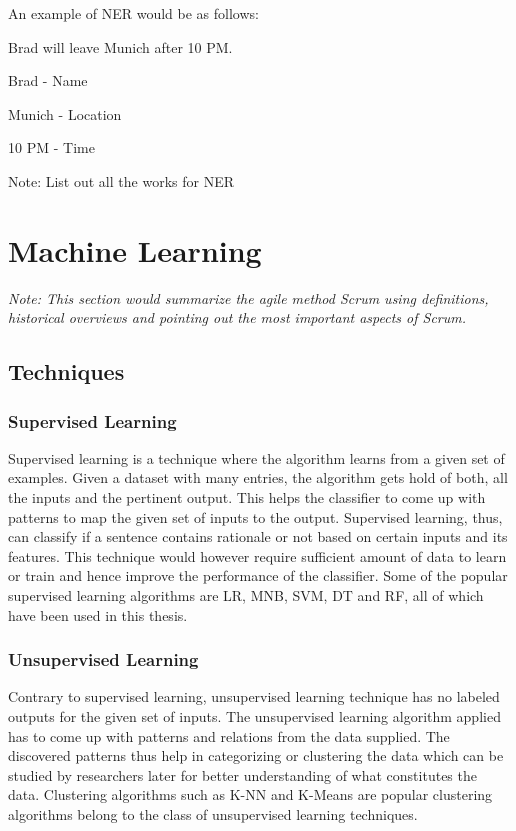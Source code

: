 \documentclass[a4paper,12pt,twoside]{report}
\begin{document}
An example of NER would be as follows:

Brad will leave Munich after 10 PM. 

Brad - Name

Munich - Location

10 PM - Time

Note: List out all the works for NER




\section{Machine Learning}

\textit{Note: This section would summarize the agile method Scrum using definitions, historical overviews and pointing out the most important aspects of Scrum.}

\subsection{Techniques}

\subsubsection{Supervised Learning}
Supervised learning is a technique where the algorithm learns from a given set of examples. Given a dataset with many entries, the algorithm gets hold of both, all the inputs and the pertinent output. This helps the classifier to come up with patterns to map the given set of inputs to the output. Supervised learning, thus, can classify if a sentence contains rationale or not based on certain inputs and its features. This technique would however require sufficient amount of data to learn or train and hence improve the performance of the classifier. Some of the popular supervised learning algorithms are LR, MNB, SVM, DT and RF, all of which have been used in this thesis.

\subsubsection{Unsupervised Learning}  
Contrary to supervised learning, unsupervised learning technique has no labeled outputs for the given set of inputs. The unsupervised learning algorithm applied has to come up with patterns and relations from the data supplied. The discovered patterns thus help in categorizing or clustering the data which can be studied by researchers later for better understanding of what constitutes the data. Clustering algorithms such as K-NN and K-Means are popular clustering algorithms belong to the class of unsupervised learning techniques. 
\end{document}
